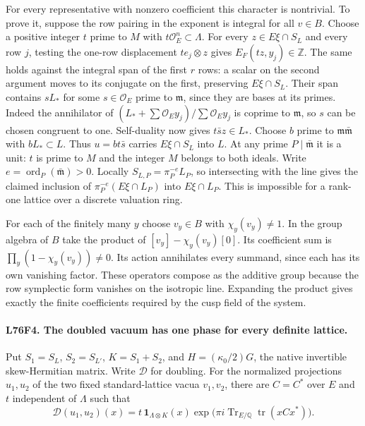 For every representative with nonzero coefficient this character
is nontrivial. To prove it, suppose the row pairing in the
exponent is integral for all $v\in B$. Choose a positive integer
$t$ prime to $M$ with $t\mathcal O_E^n\subset\Lambda$.
For every $z\in E\xi\cap S_L$ and every row $j$, testing the
one-row displacement $t e_j\otimes z$ gives $E_F(tz,y_j)\in
\mathbb Z$. The same holds against the integral span of the
first $r$ rows: a scalar on the second argument moves to its
conjugate on the first, preserving $E\xi\cap S_L$. Their span
contains $sL_*$ for some $s\in\mathcal O_E$ prime to
$\mathfrak m$, since they are bases at its primes. Indeed the
annihilator of $(L_*+\sum\mathcal O_E y_j)/\sum\mathcal O_E y_j$
is coprime to $\mathfrak m$, so $s$ can be chosen congruent to one.
Self-duality now gives $t\bar s z\in L_*$. Choose $b$ prime to
$\mathfrak m\bar{\mathfrak m}$ with $b L_*\subset L$. Thus
$u=b t\bar s$ carries $E\xi\cap S_L$ into $L$. At any prime
$P\mid\bar{\mathfrak m}$ it is a unit: $t$ is prime to $M$ and
the integer $M$ belongs to both ideals. Write
$e=\operatorname{ord}_P(\bar{\mathfrak m})>0$. Locally
$S_{L,P}=\pi_P^{-e}L_P$, so intersecting with the line gives the
claimed inclusion of $\pi_P^{-e}(E\xi\cap L_P)$ into
$E\xi\cap L_P$. This is impossible for a rank-one lattice over
a discrete valuation ring.

For each of the finitely many $y$ choose $v_y\in B$ with
$\chi_y(v_y)\ne1$. In the group algebra of $B$ take the product
of $[v_y]-\chi_y(v_y)[0]$. Its coefficient sum is
$\prod_y(1-\chi_y(v_y))\ne0$. Its action annihilates every
summand, since each has its own vanishing factor. These operators
compose as the additive group because the row symplectic form
vanishes on the isotropic line. Expanding the product gives exactly
the finite coefficients required by the cusp field of the system.

\paragraph{L76F4. The doubled vacuum has one phase for every definite lattice.}
Put $S_1=S_L$, $S_2=S_{L'}$, $K=S_1+S_2$, and
$H=(\kappa_0/2)G$, the native invertible skew-Hermitian matrix.
Write $\mathcal D$ for doubling. For the normalized projections
$u_1,u_2$ of the two fixed standard-lattice vacua $v_1,v_2$,
there are $C=C^*$ over $E$ and $t$ independent of $\Lambda$ such that
\[
 \mathcal D(u_1,u_2)(x)=
 t\,\mathbf1_{\Lambda\otimes K}(x)
 \exp\!\big(\pi i\operatorname{Tr}_{E/\mathbb Q}
                   \operatorname{tr}(xCx^*)\big).
\]

